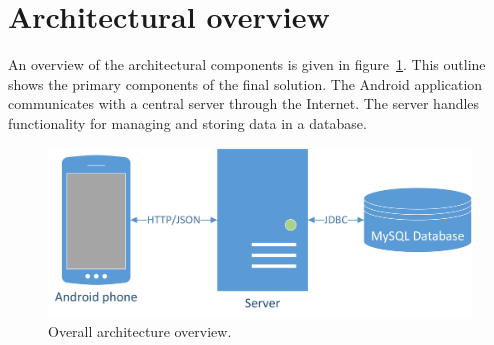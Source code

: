 \section{Architectural overview}
An overview of the architectural components is given in figure~\ref{fig:architecture}. This outline shows the primary components of the final solution. The Android application communicates with a central server through the Internet. The server handles functionality for managing and storing data in a database.

\begin{figure}[H]
\includegraphics[width=\textwidth]{ch/architecture/fig/arch.png}
\caption{Overall architecture overview.}
\label{fig:architecture}
\end{figure}
